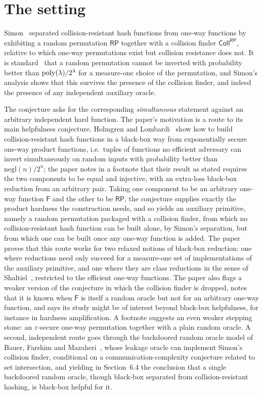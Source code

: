 \documentclass{aicr-conjecture}
\newcommand{\Fs}{\mathsf{F}}          %
\newcommand{\RP}{\mathsf{RP}}         %
\newcommand{\Coll}{\mathsf{Coll}}     %
\newcommand{\negl}{\mathrm{negl}}
\begin{document}
\section{The setting}\label{sec:setting}

Simon~\cite{Sim98} separated collision-resistant hash functions from
one-way functions by exhibiting a random permutation $\RP$ together with
a collision finder $\Coll^{\RP}$, relative to which one-way permutations
exist but collision resistance does not. It is standard~\cite{IR89} that
a random permutation cannot be inverted with probability better than
$\mathrm{poly}(\lambda)/2^{\lambda}$ for a measure-one choice of the
permutation, and Simon's analysis shows that this survives the presence
of the collision finder, and indeed the presence of any independent
auxiliary oracle.

The conjecture asks for the corresponding \emph{simultaneous} statement
against an arbitrary independent hard function. The paper's motivation
is a route to its main helpfulness conjecture. Holmgren and
Lombardi~\cite{HL18} show how to build collision-resistant hash
functions in a black-box way from exponentially secure one-way product
functions, i.e.\ tuples of functions no efficient adversary can invert
simultaneously on random inputs with probability better than
$\negl(n)/2^{n}$; the paper notes in a footnote that their result as
stated requires the two components to be equal and injective, with an
extra-loss black-box reduction from an arbitrary pair. Taking one
component to be an arbitrary one-way function $\Fs$ and the other to be
$\RP$, the conjecture supplies exactly the product hardness the
construction needs, and so yields an auxiliary primitive, namely a
random permutation packaged with a collision finder, from which no
collision-resistant hash function can be built alone, by Simon's
separation, but from which one can be built once any one-way function is
added. The paper proves that this route works for two relaxed notions of
black-box reduction: one where reductions need only succeed for a
measure-one set of implementations of the auxiliary primitive, and one
where they are class reductions in the sense of Shaltiel~\cite{Sha20},
restricted to the efficient one-way functions. The paper also flags a
weaker version of the conjecture in which the collision finder is
dropped, notes that it is known when $\Fs$ is itself a random oracle but
not for an arbitrary one-way function, and says its study might be of
interest beyond black-box helpfulness, for instance in hardness
amplification. A footnote suggests an even weaker stepping stone: an
$\varepsilon$-secure one-way permutation together with a plain random
oracle. A second, independent route goes through the backdoored random
oracle model of Bauer, Farshim and Mazaheri~\cite{BFM18}, whose leakage
oracle can implement Simon's collision finder, conditional on a
communication-complexity conjecture related to set intersection, and
yielding in Section~6.4 the conclusion that a single backdoored random
oracle, though black-box separated from collision-resistant hashing, is
black-box helpful for it.
\end{document}
